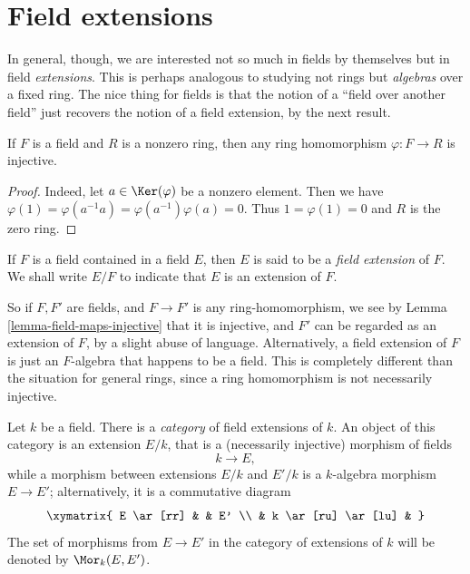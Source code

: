 \section{Field extensions}
\label{section-extensions}

\noindent
In general, though, we are interested not so much in fields by themselves but
in field {\it extensions}. This is perhaps analogous to studying not rings
but {\it algebras} over a fixed ring.
The nice thing for fields is that the notion of a ``field over another field''
just recovers the notion of a field extension, by the next result.

\begin{lemma}
\label{lemma-field-maps-injective}
If $F$ is a field and $R$ is a nonzero ring, then any ring homomorphism
$\varphi : F \to R$ is injective.
\end{lemma}

\begin{proof}
Indeed, let $a \in \Ker(\varphi)$ be a nonzero element. Then we have
$\varphi(1) = \varphi(a^{-1} a) = \varphi(a^{-1}) \varphi(a) = 0$.
Thus $1 = \varphi(1) = 0$ and $R$ is the zero ring.
\end{proof}

\begin{definition}
\label{definition-extension}
If $F$ is a field contained in a field $E$, then $E$ is said
to be a {\it field extension} of $F$. We shall write $E/F$ to indicate
that $E$ is an extension of $F$.
\end{definition}

\noindent
So if $F, F'$ are fields, and $F \to F'$ is any ring-homomorphism, we see by
Lemma \ref{lemma-field-maps-injective} that it is injective, and $F'$ can be
regarded as an extension of $F$, by a slight abuse of language. Alternatively,
a field extension of $F$ is just an $F$-algebra that happens to be a field.
This is completely different than the situation for general rings, since a
ring homomorphism is not necessarily injective.

\medskip\noindent
Let $k$ be a field. There is a {\it category} of field extensions of $k$.
An object of this category is an extension $E/k$, that is a
(necessarily injective) morphism of fields
$$
k \to E,
$$
while a morphism between extensions $E/k$ and $E'/k$ is a $k$-algebra
morphism $E \to E'$; alternatively, it is a commutative diagram
$$
\xymatrix{
E \ar[rr] & & E' \\
& k \ar[ru] \ar[lu] &
}
$$
The set of morphisms from $E \to E'$ in the category of extensions of $k$
will be denoted by $\Mor_k(E, E')$.

